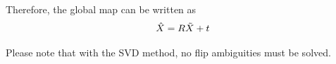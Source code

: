 Therefore, the global map can be written as
\begin{equation}
    \hat{X} = R \Tilde{X} + t
\end{equation}

Please note that with the SVD method, no flip ambiguities must be solved.



